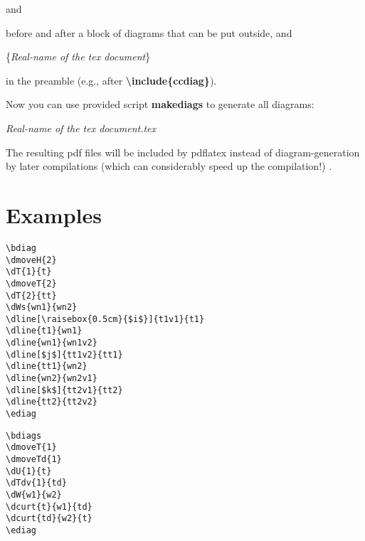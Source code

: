 \documentclass[a4paper]{article}
\newcommand{\myind}{\hspace{10pt}}
\begin{document}
and

\myind{\bf \textbackslash endpgfgraphicnamed}

before and after a block of diagrams that can be put outside, and 

\myind{\bf \textbackslash pgfrealjobname}\{{\it Real-name of the tex document}\}

in the preamble (e.g., after {\bf \textbackslash include\{ccdiag\}}).

Now you can use provided script {\bf makediags} to generate all diagrams:

\myind{\bf makediags} {\it Real-name of the tex document.tex}

The resulting pdf files will be included by pdflatex 
instead of diagram-generation by later compilations (which can considerably speed up the compilation!) .

\section{Examples}
 \begin{minipage}[b]{0.55\linewidth}\centering
  \begin{lstlisting}
\bdiag
\dmoveH{2}
\dT{1}{t}
\dmoveT{2}
\dT{2}{tt}
\dWs{wn1}{wn2}
\dline[\raisebox{0.5cm}{$i$}]{t1v1}{t1}
\dline{t1}{wn1}
\dline{wn1}{wn1v2}
\dline[$j$]{tt1v2}{tt1}
\dline{tt1}{wn2}
\dline{wn2}{wn2v1}
\dline[$k$]{tt2v1}{tt2}
\dline{tt2}{tt2v2}
\ediag
  \end{lstlisting}
 \end{minipage}
 \begin{minipage}[b]{0.45\linewidth}\centering
\bdiag
{}
\ediag
 \end{minipage}

 \begin{minipage}[b]{0.55\linewidth}\centering
  \begin{lstlisting}
\bdiags
\dmoveT{1}
\dmoveTd{1}
\dU{1}{t}
\dTdv{1}{td}
\dW{w1}{w2}
\dcurt{t}{w1}{td}
\dcurt{td}{w2}{t}
\ediag
  \end{lstlisting}
 \end{minipage}
 \begin{minipage}[b]{0.45\linewidth}\centering
\bdiags
{}
\ediag
 \end{minipage}
\end{document}
